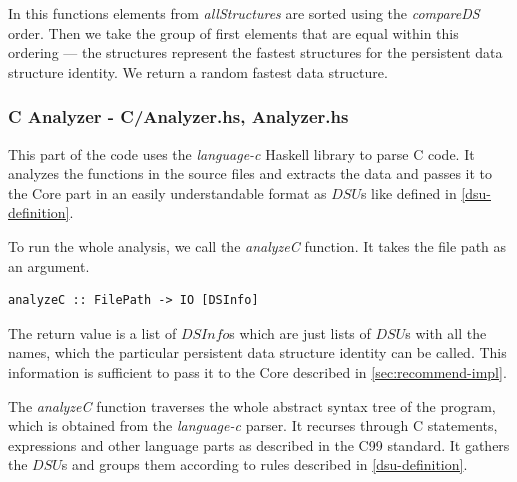 \documentclass[a4paper,11pt]{article}
\begin{document}
\begin{appendices}
		In this functions elements from \emph{allStructures} are sorted using the \emph{compareDS} order.
		Then we take the group of first elements that are equal within this ordering --- the structures
		represent the fastest structures for the persistent data structure identity. We return a random
		fastest data structure.
		
		\subsubsection{C Analyzer - C/Analyzer.hs, Analyzer.hs}
		This part of the code uses the \emph{language-c} Haskell library to parse C code. 
		It analyzes the functions in the source files and extracts the data and passes it
		to the Core part in an easily understandable format as $DSU$s like defined in \autoref{dsu-definition}.

		To run the whole analysis, we call the \emph{analyzeC} function. It takes the file path as an argument.
\begin{verbatim}
analyzeC :: FilePath -> IO [DSInfo]
\end{verbatim}
		The return value is a list of $DSInfo$s which are just lists of $DSU$s with all the names, 
		which the particular persistent data structure identity can be called. This information is 
		sufficient to pass it to the Core described in \autoref{sec:recommend-impl}.

		The \emph{analyzeC} function traverses the whole abstract syntax tree of the program, which
		is obtained from the \emph{language-c} parser. It recurses through C statements, expressions 
		and other language parts as described in the C99 standard. It gathers the $DSU$s and groups them
		according to rules described in \autoref{dsu-definition}.
				

\end{appendices}
\end{document}
